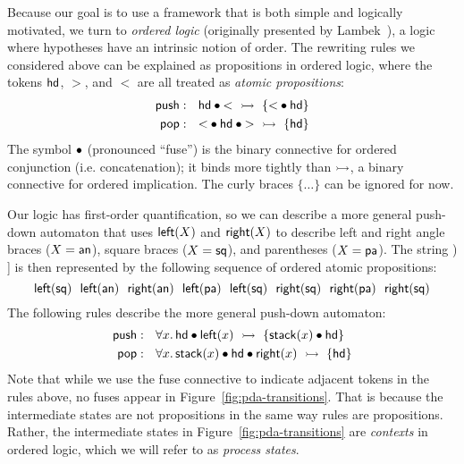 Because our goal is to use a framework that is both simple and
logically motivated, we turn to {\it ordered logic} (originally
presented by Lambek~\cite{lambek58mathematics}), a logic where
hypotheses have an intrinsic notion of order. The rewriting rules
we considered above can be explained as propositions in ordered
logic, where the tokens ${\sf hd}$, $>$, and $<$ are all treated as
{\it atomic propositions}:
\begin{align*}
{\sf push} &: ~~ {\sf hd} \mathbin{\bullet} {<} ~\rightarrowtail~ \{ {<} \mathbin{\bullet} {\sf hd} \}
\\ 
{\sf pop} &: ~~ {<} \mathbin{\bullet} {\sf hd} \mathbin{\bullet} {>} ~\rightarrowtail~ \{ {\sf hd} \}
\end{align*}
The symbol $\mathbin{\bullet}$ (pronounced ``fuse'') is the binary connective for
ordered conjunction (i.e. concatenation); it binds more tightly than
$\rightarrowtail$, a binary connective for ordered implication. The curly
braces $\{ \ldots \}$ can be ignored for now.

Our logic has first-order quantification, so we can describe a more
general push-down automaton that uses ${\sf left}(X)$ and ${\sf
  right}(X)$ to describe left and right angle braces ($X = {\sf an}$),
square braces ($X = {\sf sq}$), and parentheses ($X = {\sf pa}$). The
string {\sf [ \textless~\textgreater~( [ ] ) ]} is then represented by
the following sequence of ordered atomic propositions:
\[
{\sf 
  left(sq) ~~
  left(an) ~~
  right(an) ~~
  left(pa) ~~
  left(sq) ~~
  right(sq) ~~
  right(pa) ~~
  right(sq)
}
\]
The following rules describe the more general push-down automaton:
\begin{align*}
{\sf push} &: ~~ \forall x.\, 
  {\sf hd} \mathbin{\bullet} {\sf left}(x) ~\rightarrowtail~ \{ {\sf stack}(x) \mathbin{\bullet} {\sf hd} \}
\\ 
{\sf pop} &: ~~ \forall x.\, 
  {\sf stack}(x) \mathbin{\bullet} {\sf hd} \mathbin{\bullet} {\sf right}(x) ~\rightarrowtail~ \{ {\sf hd} \}
\end{align*}
Note that while we use the fuse connective to indicate adjacent tokens
in the rules above, no fuses appear in
Figure~\ref{fig:pda-transitions}. That is because the intermediate
states are not propositions in the same way rules are
propositions. Rather, the intermediate states in
Figure~\ref{fig:pda-transitions} are {\it contexts} in ordered logic,
which we will refer to as {\it process states}. 

